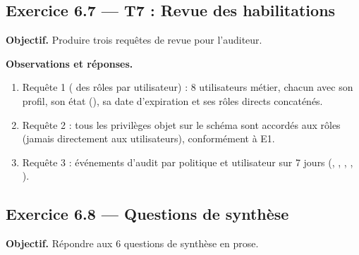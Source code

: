\subsection{Exercice 6.7 — T7 : Revue des habilitations}
\textbf{Objectif.} Produire trois requêtes de revue pour l'auditeur.


\textbf{Observations et réponses.}
\begin{enumerate}
  \item Requête 1 ( des rôles par utilisateur) : 8 utilisateurs métier,
        chacun avec son profil, son état (), sa date d'expiration et ses rôles
        directs concaténés.
  \item Requête 2 : tous les privilèges objet sur le schéma  sont accordés
        aux rôles (jamais directement aux utilisateurs), conformément à E1.
  \item Requête 3 : événements d'audit par politique et utilisateur sur 7 jours
        (, , ,
        , ).
\end{enumerate}

\subsection{Exercice 6.8 — Questions de synthèse}
\textbf{Objectif.} Répondre aux 6 questions de synthèse en prose.

